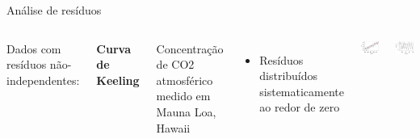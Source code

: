 \documentclass{beamer}\usepackage[]{graphicx}\usepackage[]{color}
\newenvironment{knitrout}{}{} %
\renewenvironment{knitrout}{\setlength{\topsep}{0mm}}{}
\begin{document}

\begin{frame}{Análise de resíduos}

\begin{columns}[c]

\small

Dados com resíduos não-independentes:

\bigskip
\textbf{Curva de Keeling }

Concentração de CO2 atmosférico medido em Mauna Loa, Hawaii
\bigskip
\begin{itemize}
\item Resíduos distribuídos sistematicamente ao redor de zero
\end{itemize}



\begin{knitrout}
\color{fgcolor}
\includegraphics[width=1\linewidth]{figure/r9-1} 

\includegraphics[width=1\linewidth]{figure/r9-2} 


\end{knitrout}
\end{columns}
\end{frame}
\end{document}
